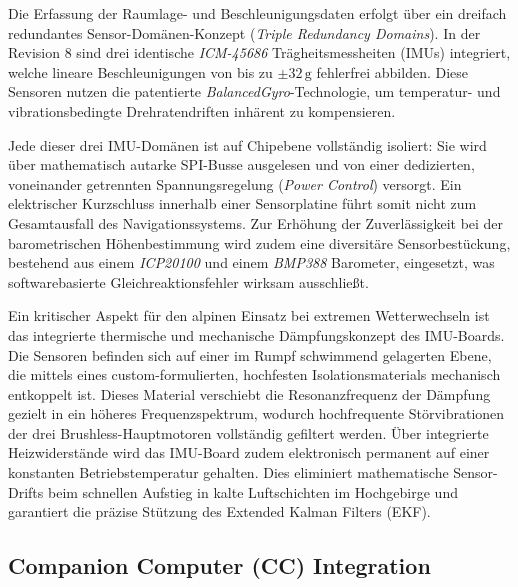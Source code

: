Die Erfassung der Raumlage- und Beschleunigungsdaten erfolgt über ein dreifach redundantes Sensor-Domänen-Konzept (\textit{Triple Redundancy Domains}). 
In der Revision 8 sind drei identische \textit{ICM-45686} Trägheitsmessheiten (IMUs) integriert, welche lineare Beschleunigungen von bis zu $\pm32\,\text{g}$ 
fehlerfrei abbilden. Diese Sensoren nutzen die patentierte \textit{BalancedGyro\texttrademark}-Technologie, um temperatur- und vibrationsbedingte 
Drehratendriften inhärent zu kompensieren. 

Jede dieser drei IMU-Domänen ist auf Chipebene vollständig isoliert: Sie wird über mathematisch autarke SPI-Busse ausgelesen und von einer dedizierten, 
voneinander getrennten Spannungsregelung (\textit{Power Control}) versorgt. Ein elektrischer Kurzschluss innerhalb einer Sensorplatine führt somit nicht 
zum Gesamtausfall des Navigationssystems. Zur Erhöhung der Zuverlässigkeit bei der barometrischen Höhenbestimmung wird zudem eine diversitäre Sensorbestückung, 
bestehend aus einem \textit{ICP20100} und einem \textit{BMP388} Barometer, eingesetzt, was softwarebasierte Gleichreaktionsfehler wirksam ausschließt.

Ein kritischer Aspekt für den alpinen Einsatz bei extremen Wetterwechseln ist das integrierte thermische und mechanische Dämpfungskonzept des IMU-Boards.
 Die Sensoren befinden sich auf einer im Rumpf schwimmend gelagerten Ebene, die mittels eines custom-formulierten, hochfesten Isolationsmaterials mechanisch entkoppelt ist. 
 Dieses Material verschiebt die Resonanzfrequenz der Dämpfung gezielt in ein höheres Frequenzspektrum, wodurch hochfrequente Störvibrationen der 
 drei Brushless-Hauptmotoren vollständig gefiltert werden. Über integrierte Heizwiderstände wird das IMU-Board zudem elektronisch permanent auf einer 
 konstanten Betriebstemperatur gehalten. Dies eliminiert mathematische Sensor-Drifts beim schnellen Aufstieg in kalte Luftschichten im Hochgebirge und garantiert 
 die präzise Stützung des Extended Kalman Filters (EKF).


\subsection{Companion Computer (CC) Integration}
\label{sec:companion_computer_integration}

